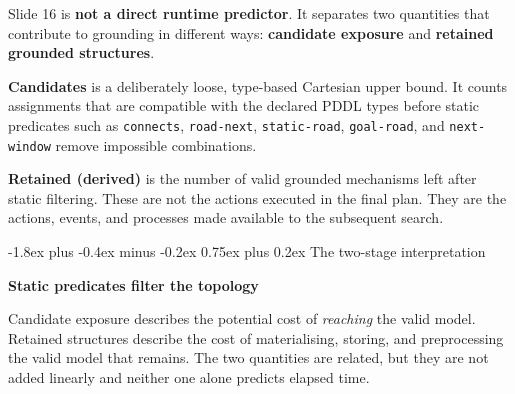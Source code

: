 \documentclass[11pt,a4paper]{article}
\makeatletter
\renewcommand{\subsection}{\@startsection{subsection}{2}{0pt}
  {-1.8ex plus -0.4ex minus -0.2ex}
  {0.75ex plus 0.2ex}
  {\normalfont\large\bfseries\color{RoutlyNavy}}}
\makeatother
\begin{document}
\begin{keybox}
Slide 16 is \textbf{not a direct runtime predictor}. It separates two
quantities that contribute to grounding in different ways:
\textbf{candidate exposure} and \textbf{retained grounded structures}.
\end{keybox}

\begin{definitionbox}
\textbf{Candidates} is a deliberately loose, type-based Cartesian upper
bound. It counts assignments that are compatible with the declared PDDL
types before static predicates such as \texttt{connects},
\texttt{road-next}, \texttt{static-road}, \texttt{goal-road}, and
\texttt{next-window} remove impossible combinations.

\textbf{Retained (derived)} is the number of valid grounded mechanisms left
after static filtering. These are not the actions executed in the final plan.
They are the actions, events, and processes made available to the subsequent
search.
\end{definitionbox}

\subsection{The two-stage interpretation}

\begin{center}
{\small\bfseries\color{RoutlyOrange}
Static predicates filter the topology\par}
\vspace{1mm}
\end{center}

Candidate exposure describes the potential cost of \emph{reaching} the valid
model. Retained structures describe the cost of materialising, storing, and
preprocessing the valid model that remains. The two quantities are related,
but they are not added linearly and neither one alone predicts elapsed time.
\end{document}
